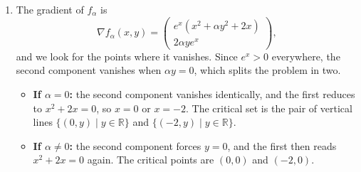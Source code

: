 \begin{exercisesolution}
\label{sol:hessian_parameterized_exp}
\begin{enumerate}[label=\textbf{(\alph*)}]
  \item The gradient of $f_\alpha$ is
\[\nabla f_\alpha(x,y) = \begin{pmatrix} e^x(x^2 + \alpha y^2 + 2x) \\ 2\alpha y e^x \end{pmatrix},\]
and we look for the points where it vanishes. Since $e^x > 0$ everywhere, the second component
vanishes when $\alpha y = 0$, which splits the problem in two.
\begin{itemize}
  \item \textbf{If $\alpha = 0$:} the second component vanishes identically, and the first reduces
    to $x^2 + 2x = 0$, so $x = 0$ or $x = -2$. The critical set is the pair of vertical lines
    $\{(0,y) \mid y \in \mathbb{R}\}$ and $\{(-2,y) \mid y \in \mathbb{R}\}$.
  \item \textbf{If $\alpha \neq 0$:} the second component forces $y = 0$, and the first then reads
    $x^2 + 2x = 0$ again. The critical points are $(0,0)$ and $(-2,0)$.
\end{itemize}


\end{enumerate}
\end{exercisesolution}
